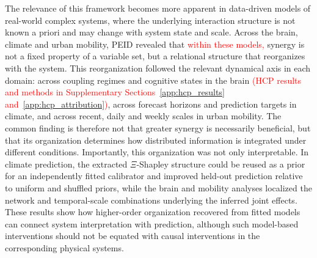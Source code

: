 \documentclass[fleqn,10pt]{wlscirep}
\newcommand{\rev}[1]{\textcolor{red}{#1}}
\theoremstyle{naturetheorem}
\begin{document}
The relevance of this framework becomes more apparent in data-driven models of real-world complex systems, where the underlying interaction structure is not known a priori and may change with system state and scale. Across the brain, climate and urban mobility, PEID revealed that \rev{within these models, }synergy is not a fixed property of a variable set, but a relational structure that reorganizes with the system. This reorganization followed the relevant dynamical axis in each domain: across coupling regimes and cognitive states in the brain
\rev{(HCP results and methods in Supplementary Sections~\ref{app:hcp_results} and~\ref{app:hcp_attribution})}, across forecast horizons and prediction targets in climate, and across recent, daily and weekly scales in urban mobility. The common finding is therefore not that greater synergy is necessarily beneficial, but that its organization determines how distributed information is integrated under different conditions. Importantly, this organization was not only interpretable. In climate prediction, the extracted $\Xi$-Shapley structure could be reused as a prior for an independently fitted calibrator and improved held-out prediction relative to uniform and shuffled priors, while the brain and mobility analyses localized the network and temporal-scale combinations underlying the inferred joint effects. These results show how higher-order organization recovered from fitted models can connect system interpretation with prediction, although such model-based interventions should not be equated with causal interventions in the corresponding physical systems.
\end{document}
